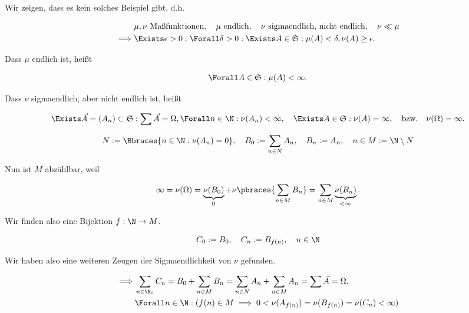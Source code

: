 \begin{solution}

Wir zeigen, dass es kein solches Beispiel gibt, d.h.

\begin{align*}
    &
    \mu, \nu ~\text{Maßfunktionen}, \quad
    \mu ~\text{endlich}, \quad
    \nu ~\text{sigmaendlich, nicht endlich}, \quad
    \nu \ll \mu \\
    \implies &
    \Exists \epsilon > 0:
        \Forall \delta > 0:
            \Exists A \in \mathfrak S:
                \mu(A) < \delta, \nu(A) \geq \epsilon.
\end{align*}

Dass $\mu$ endlich ist, heißt

\begin{align*}
    \Forall A \in \mathfrak S:
        \mu(A) < \infty.
\end{align*}

Dass $\nu$ sigmaendlich, aber nicht endlich ist, heißt

\begin{align*}
    \Exists \vec A = (A_n) \subset \mathfrak S:
        \sum \vec A = \Omega,
        \Forall n \in \N:
            \nu(A_n) < \infty,
    \quad
    \Exists A \in \mathfrak S:
        \nu(A) = \infty,
    \quad
    \text{bzw.}
    \quad
    \nu(\Omega) = \infty.
\end{align*}

\begin{align*}
    N := \Bbraces{n \in \N: \nu(A_n) = 0},
    \quad
    B_0 := \sum_{n \in N} A_n,
    \quad
    B_n := A_n,
    \quad
    n \in M := \N \setminus N
\end{align*}

Nun ist $M$ abzählbar, weil

\begin{align*}
    \infty
    =
    \nu(\Omega)
    =
    \underbrace{\nu(B_0)}_0 + \nu \pbraces{\sum_{n \in M} B_n}
    =
    \sum_{n \in M} \underbrace{\nu(B_n)}_{< \infty}.
\end{align*}

Wir finden also eine Bijektion $f: \N \to M$.

\begin{align*}
    C_0 := B_0,
    \quad
    C_n := B_{f(n)},
    \quad
    n \in \N
\end{align*}

Wir haben also eine weiteren Zeugen der Sigmaendlichkeit von $\nu$ gefunden.

\begin{align*}
    \implies &
    \sum_{n \in \N_0} C_n
    =
    B_0 + \sum_{n \in M} B_n
    =
    \sum_{n \in N} A_n + \sum_{n \in M} A_n
    =
    \sum \vec A
    =
    \Omega, \\
    &
    \Forall n \in \N:
        (
            f(n) \in M
            \implies
            0 < \nu(A_{f(n)}) = \nu(B_{f(n)}) = \nu(C_n) < \infty
        )
\end{align*}


\end{solution}
